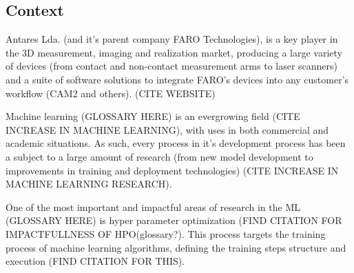 
\subsection{Context}

Antares Lda. (and it's parent company FARO Technologies), is a key player in the 3D measurement, imaging and realization market, producing a large variety of devices (from contact and non-contact measurement arms to laser scanners) and a suite of software solutions to integrate FARO's devices into any customer's workflow (CAM2 \texttrademark and others). (CITE WEBSITE)
 
Machine learning (GLOSSARY HERE) is an evergrowing field (CITE INCREASE IN MACHINE LEARNING), with uses in both commercial and academic situations. As such, every process in it's development process has been a subject to a large amount of research (from new model development to improvements in training and deployment technologies) (CITE INCREASE IN MACHINE LEARNING RESEARCH).

One of the most important and impactful areas of research in the ML (GLOSSARY HERE) is hyper parameter optimization (FIND CITATION FOR IMPACTFULLNESS OF HPO(glossary?). This process targets the training process of machine learning algorithms, defining the training steps structure and execution (FIND CITATION FOR THIS).